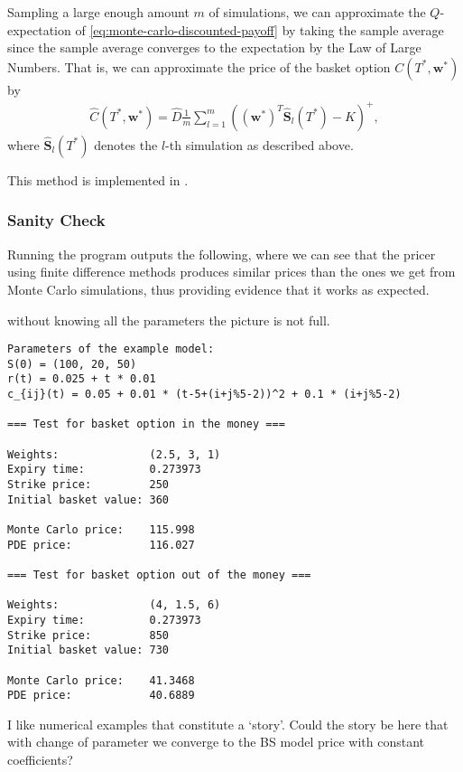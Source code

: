 \documentclass[english]{article}
\newcommand{\comment}[1]{\color{blue}#1\color{black}}
\numberwithin{equation}{section}
\numberwithin{figure}{section}
\theoremstyle{bolddescit}
\theoremstyle{definition}
\theoremstyle{definition}
\theoremstyle{plain}
\theoremstyle{plain}
\theoremstyle{bolddesc}
\theoremstyle{plain}
\theoremstyle{remark}
\begin{document}
Sampling a large enough amount $m$ of simulations, we can approximate the $Q$-expectation of \eqref{eq:monte-carlo-discounted-payoff} by taking the sample average since the sample average converges to the expectation by the Law of Large Numbers. That is, we can approximate the price of the basket option $C(T^*,\mathbf{w}^*)$ by
\begin{align*}
  \hat{C}(T^*,\mathbf{w}^*) = \hat{D} \frac{1}{m} \sum_{l=1}^{m} ((\mathbf{w}^*)^T \hat{\mathbf{S}}_l(T^*) - K)^+,
\end{align*}
where $\hat{\mathbf{S}}_l(T^*)$ denotes the $l$-th simulation as described above.

This method is implemented in .

\subsubsection{Sanity Check}

Running the program outputs the following, where we can see that the pricer using finite difference methods produces similar prices than the ones we get from Monte Carlo simulations, thus providing evidence that it works as expected.

\comment{without knowing all the parameters the picture is not full.}

{\small
\begin{verbatim}
Parameters of the example model:
S(0) = (100, 20, 50)
r(t) = 0.025 + t * 0.01
c_{ij}(t) = 0.05 + 0.01 * (t-5+(i+j%5-2))^2 + 0.1 * (i+j%5-2)

=== Test for basket option in the money ===

Weights:              (2.5, 3, 1)
Expiry time:          0.273973
Strike price:         250
Initial basket value: 360

Monte Carlo price:    115.998
PDE price:            116.027

=== Test for basket option out of the money ===

Weights:              (4, 1.5, 6)
Expiry time:          0.273973
Strike price:         850
Initial basket value: 730

Monte Carlo price:    41.3468
PDE price:            40.6889
\end{verbatim}
}

\comment{I like numerical examples that constitute a `story'. Could the story be here that with change of parameter we converge to the BS model price with constant coefficients? }
\end{document}
